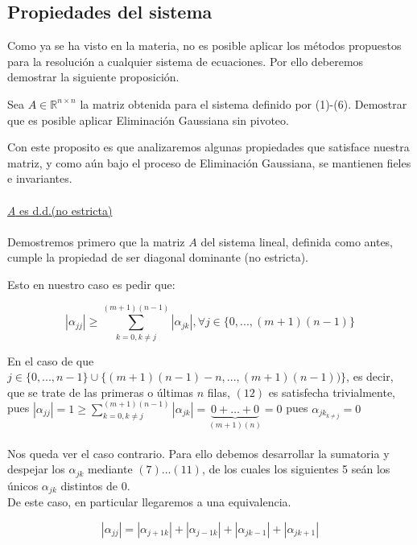 \subsection{Propiedades del sistema}
Como ya se ha visto en la materia, no es posible aplicar los métodos propuestos para la resoluci\'on a cualquier sistema de ecuaciones. Por ello deberemos demostrar la siguiente proposici\'on.

\begin{proposition}
Sea $A \in \mathbb{R}^{n \times n}$ la matriz obtenida para el sistema definido por (1)-(6). Demostrar que es posible
aplicar Eliminaci\'on Gaussiana sin pivoteo.
\end{proposition}

Con este proposito es que analizaremos algunas propiedades que satisface nuestra matriz, y como a\'un bajo el proceso de Eliminaci\'on Gaussiana, se mantienen fieles e invariantes.
\\
\\
\underline{\textit{A} es d.d.(no estricta)}
\\
\\
Demostremos primero que la matriz $A$ del sistema lineal, definida como antes, cumple la propiedad de ser diagonal dominante (no estricta).

Esto en nuestro caso es pedir que:

\begin{equation}
 \left | \alpha_{jj} \right | \geq \sum_{k=0,k \neq j}^{(m+1)(n-1)} \left | \alpha_{jk} \right |, \forall j \in \{ 0,...,(m+1)(n-1)\}
\end{equation}

En el caso de que $j \in \{0,...,n-1\} \cup \{(m+1)(n-1)-n,...,(m+1)(n-1))\}$, es decir, que se trate de las primeras o \'ultimas $n$ filas, $(12)$ es satisfecha trivialmente, pues  $\left | \alpha_{jj} \right | = 1 \geq \sum_{k=0,k \neq j}^{(m+1)(n-1)} \left | \alpha_{jk} \right | =  \underbrace{0+ \ldots +0}_{(m+1)(n)} = 0$ pues $\alpha_{jk_{k\neq j}}=0 $ 
\\
\\
Nos queda ver el caso contrario. Para ello debemos desarrollar la sumatoria y despejar los $\alpha_{jk}$ mediante $(7)...(11)$, de los cuales los siguientes 5 se\'an los \'unicos $\alpha_{jk}$ distintos de $0$.
\\
De este caso, en particular llegaremos a una equivalencia.

\begin{equation}
 \left | \alpha_{jj} \right | = \left | \alpha_{j+1k} \right | + \left | \alpha_{j-1k} \right | + \left | \alpha_{jk-1} \right | + \left | \alpha_{jk+1} \right |
\end{equation}

